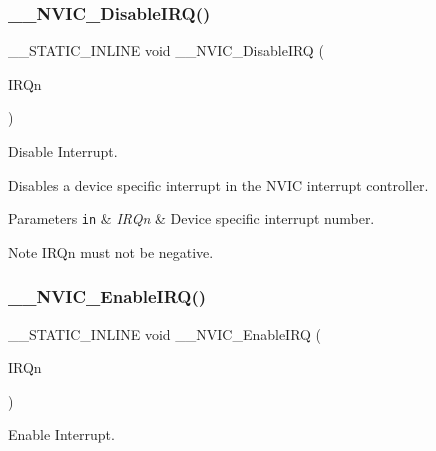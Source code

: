 \subsubsection{\texorpdfstring{\+\_\+\+\_\+\+N\+V\+I\+C\+\_\+\+Disable\+I\+R\+Q()}{\_\_NVIC\_DisableIRQ()}}
{\footnotesize\ttfamily \+\_\+\+\_\+\+S\+T\+A\+T\+I\+C\+\_\+\+I\+N\+L\+I\+NE void \+\_\+\+\_\+\+N\+V\+I\+C\+\_\+\+Disable\+I\+RQ (\begin{DoxyParamCaption}\item[{\hyperlink{group___peripheral__interrupt__number__definition_ga7e1129cd8a196f4284d41db3e82ad5c8}{I\+R\+Qn\+\_\+\+Type}}]{I\+R\+Qn }\end{DoxyParamCaption})}



Disable Interrupt. 

Disables a device specific interrupt in the N\+V\+IC interrupt controller. 
\begin{DoxyParams}[1]{Parameters}
\mbox{\tt in}  & {\em I\+R\+Qn} & Device specific interrupt number. \\
\hline
\end{DoxyParams}
\begin{DoxyNote}{Note}
I\+R\+Qn must not be negative. 
\end{DoxyNote}
\mbox{\label{group___c_m_s_i_s___core___n_v_i_c_functions_ga71227e1376cde11eda03fcb62f1b33ea}} 
\subsubsection{\texorpdfstring{\+\_\+\+\_\+\+N\+V\+I\+C\+\_\+\+Enable\+I\+R\+Q()}{\_\_NVIC\_EnableIRQ()}}
{\footnotesize\ttfamily \+\_\+\+\_\+\+S\+T\+A\+T\+I\+C\+\_\+\+I\+N\+L\+I\+NE void \+\_\+\+\_\+\+N\+V\+I\+C\+\_\+\+Enable\+I\+RQ (\begin{DoxyParamCaption}\item[{\hyperlink{group___peripheral__interrupt__number__definition_ga7e1129cd8a196f4284d41db3e82ad5c8}{I\+R\+Qn\+\_\+\+Type}}]{I\+R\+Qn }\end{DoxyParamCaption})}



Enable Interrupt. 

